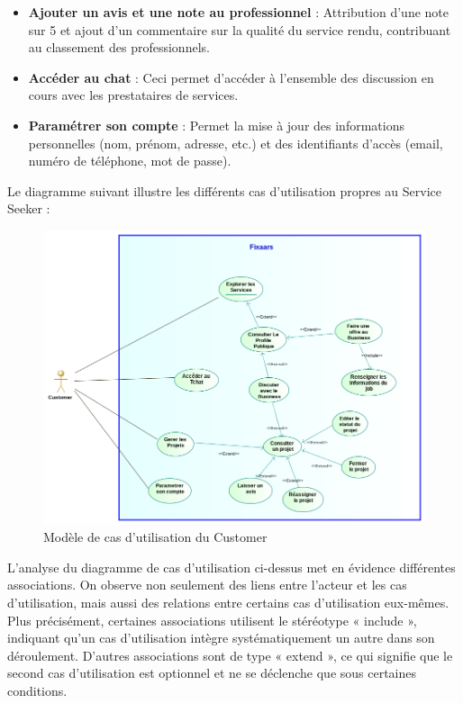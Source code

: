 {\begin{enumerate}
\begin{itemize}
            \item \textbf{Ajouter un avis et une note au professionnel} : Attribution d’une note sur 5 et ajout d’un commentaire sur la qualité du service rendu, contribuant au classement des professionnels.
            \item \textbf{Accéder au chat} : Ceci permet d'accéder à l'ensemble des discussion en cours avec les prestataires de services.
            \item \textbf{Paramétrer son compte} : Permet la mise à jour des informations personnelles (nom, prénom, adresse, etc.) et des identifiants d’accès (email, numéro de téléphone, mot de passe).
        \end{itemize}

    \vspace{0.39cm}
    
    Le diagramme suivant illustre les différents cas d'utilisation propres au Service Seeker :

    \vspace{0.39cm}
        
    \begin{figure}[H]
    \begin{center}
    \includegraphics[width=17cm]{assets/diagrams/CustomerUC.png}
    \end{center}
    \caption{Modèle de cas d'utilisation du Customer}
    \end{figure}
    
    \vspace{0.39cm}

    L’analyse du diagramme de cas d’utilisation ci-dessus met en évidence différentes associations. On observe non seulement des liens entre l’acteur et les cas d’utilisation, mais aussi des relations entre certains cas d’utilisation eux-mêmes. Plus précisément, certaines associations utilisent le stéréotype « include », indiquant qu’un cas d’utilisation intègre systématiquement un autre dans son déroulement. D’autres associations sont de type « extend », ce qui signifie que le second cas d’utilisation est optionnel et ne se déclenche que sous certaines conditions.


\end{enumerate}}
